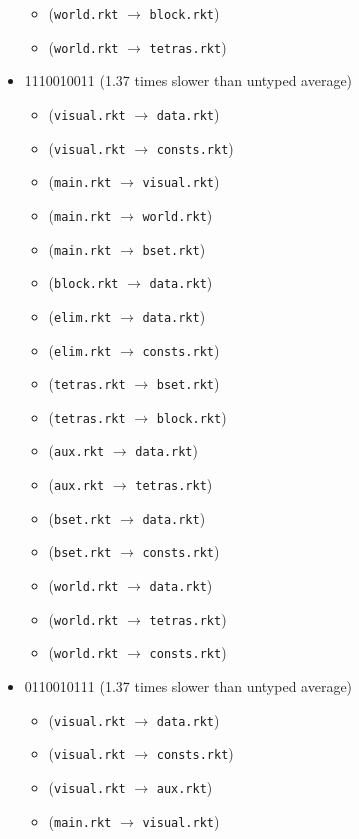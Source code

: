 \documentclass{article}
\newcommand{\mono}[1]{\texttt{#1}}
\begin{document}
\begin{itemize}
\begin{itemize}
  \item (\mono{world.rkt} $\rightarrow$ \mono{block.rkt})
  \item (\mono{world.rkt} $\rightarrow$ \mono{tetras.rkt})
  \end{itemize}
\item 1110010011 (1.37 times slower than untyped average)
  \begin{itemize}
  \item (\mono{visual.rkt} $\rightarrow$ \mono{data.rkt})
  \item (\mono{visual.rkt} $\rightarrow$ \mono{consts.rkt})
  \item (\mono{main.rkt} $\rightarrow$ \mono{visual.rkt})
  \item (\mono{main.rkt} $\rightarrow$ \mono{world.rkt})
  \item (\mono{main.rkt} $\rightarrow$ \mono{bset.rkt})
  \item (\mono{block.rkt} $\rightarrow$ \mono{data.rkt})
  \item (\mono{elim.rkt} $\rightarrow$ \mono{data.rkt})
  \item (\mono{elim.rkt} $\rightarrow$ \mono{consts.rkt})
  \item (\mono{tetras.rkt} $\rightarrow$ \mono{bset.rkt})
  \item (\mono{tetras.rkt} $\rightarrow$ \mono{block.rkt})
  \item (\mono{aux.rkt} $\rightarrow$ \mono{data.rkt})
  \item (\mono{aux.rkt} $\rightarrow$ \mono{tetras.rkt})
  \item (\mono{bset.rkt} $\rightarrow$ \mono{data.rkt})
  \item (\mono{bset.rkt} $\rightarrow$ \mono{consts.rkt})
  \item (\mono{world.rkt} $\rightarrow$ \mono{data.rkt})
  \item (\mono{world.rkt} $\rightarrow$ \mono{tetras.rkt})
  \item (\mono{world.rkt} $\rightarrow$ \mono{consts.rkt})
  \end{itemize}
\item 0110010111 (1.37 times slower than untyped average)
  \begin{itemize}
  \item (\mono{visual.rkt} $\rightarrow$ \mono{data.rkt})
  \item (\mono{visual.rkt} $\rightarrow$ \mono{consts.rkt})
  \item (\mono{visual.rkt} $\rightarrow$ \mono{aux.rkt})
  \item (\mono{main.rkt} $\rightarrow$ \mono{visual.rkt})

\end{itemize}
\end{itemize}
\end{document}
